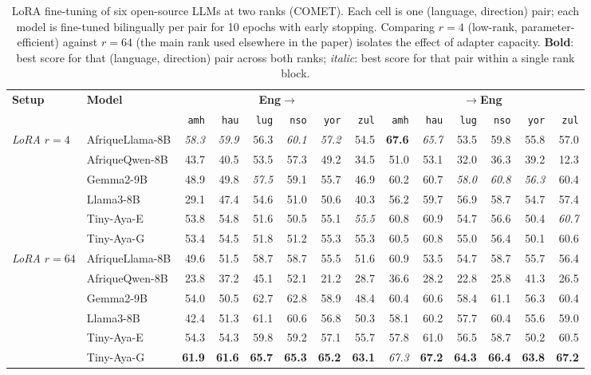 \begin{table}[t]
\centering
\small
\renewcommand{\arraystretch}{1.05}
\begin{tabular}{llrrrrrrrrrrrr}
\toprule
\textbf{Setup} & \textbf{Model} & \multicolumn{6}{c}{\textbf{Eng$\to$}} & \multicolumn{6}{c}{\textbf{$\to$Eng}} \\
\cmidrule(lr){3-8}\cmidrule(lr){9-14}
  &   & \texttt{amh} & \texttt{hau} & \texttt{lug} & \texttt{nso} & \texttt{yor} & \texttt{zul} & \texttt{amh} & \texttt{hau} & \texttt{lug} & \texttt{nso} & \texttt{yor} & \texttt{zul} \\
\midrule
\multirow{6}{*}{\textit{LoRA $r{=}4$}} & AfriqueLlama-8B & \emph{58.3} & \emph{59.9} & 56.3 & \emph{60.1} & \emph{57.2} & 54.5 & \textbf{67.6} & \emph{65.7} & 53.5 & 59.8 & 55.8 & 57.0 \\
 & AfriqueQwen-8B & 43.7 & 40.5 & 53.5 & 57.3 & 49.2 & 34.5 & 51.0 & 53.1 & 32.0 & 36.3 & 39.2 & 12.3 \\
 & Gemma2-9B & 48.9 & 49.8 & \emph{57.5} & 59.1 & 55.7 & 46.9 & 60.2 & 60.7 & \emph{58.0} & \emph{60.8} & \emph{56.3} & 60.4 \\
 & Llama3-8B & 29.1 & 47.4 & 54.6 & 51.0 & 50.6 & 40.3 & 56.2 & 59.7 & 56.9 & 58.7 & 54.7 & 57.4 \\
 & Tiny-Aya-E & 53.8 & 54.8 & 51.6 & 50.5 & 55.1 & \emph{55.5} & 60.8 & 60.9 & 54.7 & 56.6 & 50.4 & \emph{60.7} \\
 & Tiny-Aya-G & 53.4 & 54.5 & 51.8 & 51.2 & 55.3 & 55.3 & 60.5 & 60.8 & 55.0 & 56.4 & 50.1 & 60.6 \\
\midrule
\multirow{6}{*}{\textit{LoRA $r{=}64$}} & AfriqueLlama-8B & 49.6 & 51.5 & 58.7 & 58.7 & 55.5 & 51.6 & 60.9 & 53.5 & 54.7 & 58.7 & 55.7 & 56.4 \\
 & AfriqueQwen-8B & 23.8 & 37.2 & 45.1 & 52.1 & 21.2 & 28.7 & 36.6 & 28.2 & 22.8 & 25.8 & 41.3 & 26.5 \\
 & Gemma2-9B & 54.0 & 50.5 & 62.7 & 62.8 & 58.9 & 48.4 & 60.4 & 60.6 & 58.4 & 61.1 & 56.3 & 60.4 \\
 & Llama3-8B & 42.4 & 51.3 & 61.1 & 60.6 & 56.8 & 50.3 & 58.1 & 60.2 & 57.7 & 60.4 & 55.6 & 59.0 \\
 & Tiny-Aya-E & 54.3 & 54.3 & 59.8 & 59.2 & 57.1 & 55.7 & 57.8 & 61.0 & 56.5 & 58.7 & 50.2 & 60.5 \\
 & Tiny-Aya-G & \textbf{61.9} & \textbf{61.6} & \textbf{65.7} & \textbf{65.3} & \textbf{65.2} & \textbf{63.1} & \emph{67.3} & \textbf{67.2} & \textbf{64.3} & \textbf{66.4} & \textbf{63.8} & \textbf{67.2} \\
\bottomrule
\end{tabular}
\caption{LoRA fine-tuning of six open-source LLMs at two ranks (COMET). Each cell is one (language, direction) pair; each model is fine-tuned bilingually per pair for 10 epochs with early stopping. Comparing $r{=}4$ (low-rank, parameter-efficient) against $r{=}64$ (the main rank used elsewhere in the paper) isolates the effect of adapter capacity. \textbf{Bold}: best score for that (language, direction) pair across both ranks; \emph{italic}: best score for that pair within a single rank block.}
\label{tab:lora_comet}
\end{table}
